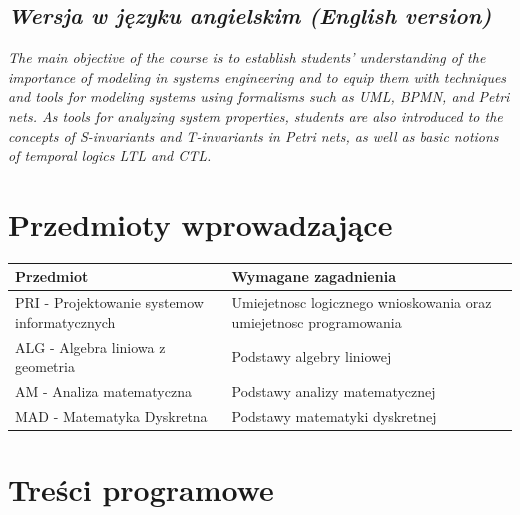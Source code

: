 \documentclass[12pt, a4paper]{article}
\newcommand{\thdrule}{\noalign{\global\setlength{\extrarowheight}{0pt}}}
\newcommand{\thdend}{\noalign{\global\setlength{\extrarowheight}{3pt}}}
\begin{document}
\subsection*{\textit{Wersja w języku angielskim (English version)}}

\textit{The main objective of the course is to establish students’ understanding of the importance of modeling in systems engineering and to equip them with techniques and tools for modeling systems using formalisms such as UML, BPMN, and Petri nets. As tools for analyzing system properties, students are also introduced to the concepts of S-invariants and T-invariants in Petri nets, as well as basic notions of temporal logics LTL and CTL.}


\section{Przedmioty wprowadzające}

{\scriptsize
\begin{tabularx}{\textwidth}{m{5cm}Y}
\thdrule\toprule
{} {\color{white}\textbf{Przedmiot}} & {\color{white}\textbf{Wymagane zagadnienia}} \\
\midrule\thdend
   PRI - Projektowanie systemow informatycznych & Umiejetnosc logicznego wnioskowania oraz umiejetnosc programowania \\
   ALG - Algebra liniowa z geometria & Podstawy algebry liniowej \\
   AM - Analiza matematyczna & Podstawy analizy matematycznej \\
   MAD - Matematyka Dyskretna & Podstawy matematyki dyskretnej \\
\bottomrule
\end{tabularx}}

\section{Treści programowe}
\end{document}
